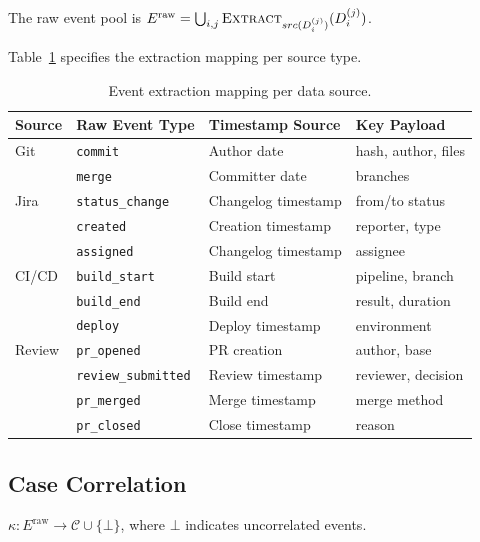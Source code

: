The raw event pool is
$E^{\text{raw}} = \bigcup_{i,j} \textsc{Extract}_{src(D_i^{(j)})}(D_i^{(j)})$.

Table~\ref{tab:event-extraction} specifies the extraction mapping per
source type.

\begin{table}[htbp]
\centering
\caption{Event extraction mapping per data source.}
\label{tab:event-extraction}
\small
\begin{tabular}{llll}
\toprule
\textbf{Source} & \textbf{Raw Event Type} & \textbf{Timestamp Source} & \textbf{Key Payload} \\
\midrule
Git    & \texttt{commit}            & Author date         & hash, author, files \\
       & \texttt{merge}             & Committer date      & branches \\
\midrule
Jira   & \texttt{status\_change}    & Changelog timestamp & from/to status \\
       & \texttt{created}           & Creation timestamp  & reporter, type \\
       & \texttt{assigned}          & Changelog timestamp & assignee \\
\midrule
CI/CD  & \texttt{build\_start}      & Build start         & pipeline, branch \\
       & \texttt{build\_end}        & Build end           & result, duration \\
       & \texttt{deploy}            & Deploy timestamp    & environment \\
\midrule
Review & \texttt{pr\_opened}        & PR creation         & author, base \\
       & \texttt{review\_submitted} & Review timestamp    & reviewer, decision \\
       & \texttt{pr\_merged}        & Merge timestamp     & merge method \\
       & \texttt{pr\_closed}        & Close timestamp     & reason \\
\bottomrule
\end{tabular}
\end{table}


\subsection{Case Correlation}
\label{sec:s1-correlation}

\begin{definition}
\label{def:correlation}
$\kappa : E^{\text{raw}} \to \mathcal{C} \cup \{\bot\}$, where $\bot$
indicates uncorrelated events.
\end{definition}

